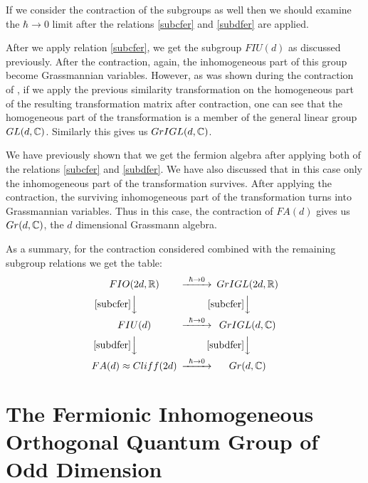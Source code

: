 If we consider the contraction of the subgroups as well then we
should examine the $\hbar \rightarrow 0$ limit after the relations
\eqref{subcfer} and \eqref{subdfer} are applied.

After we apply relation \eqref{subcfer}, we get the subgroup $FIU(d)$
as discussed previously. After the contraction,
again, the inhomogeneous part of this group become
Grassmannian variables. However, as was shown during the contraction
of \BISp, if we apply the previous similarity
transformation on the homogeneous part of the resulting transformation
matrix after contraction, one can see that the
homogeneous part of the transformation is a member of the general
linear group $GL(d, \mathbb{C})$. Similarly this gives us $GrIGL(d, \mathbb{C})$.

We have previously shown that we get the fermion
algebra after applying both of the relations \eqref{subcfer} and
\eqref{subdfer}. We have also discussed that in this case only the
inhomogeneous part of the transformation survives. After
applying the contraction, the surviving inhomogeneous part of the
transformation turns into Grassmannian variables. Thus
in this case, the contraction of $FA(d)$ gives us $Gr(d, \mathbb{C})$,
the $d$ dimensional Grassmann algebra.

As a summary, for the contraction considered combined with the
remaining subgroup relations we get the table:
\[
\begin{CD}
{FIO(2d, \IR)}            @> \hbar \rightarrow 0   >> {GrIGL(2d, \IR)} \\
@V\eqref{subcfer}VV                                    @V\eqref{subcfer}VV \\
{FIU(d)}                  @> \hbar \rightarrow 0   >> {GrIGL(d, \IC)} \\
@V\eqref{subdfer}VV                                    @V\eqref{subdfer}VV \\
{FA(d) \approx Cliff(2d)} @> \hbar \rightarrow 0    >> {Gr(d, \IC)}
\end{CD}
\]

\section{The Fermionic Inhomogeneous
Orthogonal Quantum Group of Odd Dimension}

